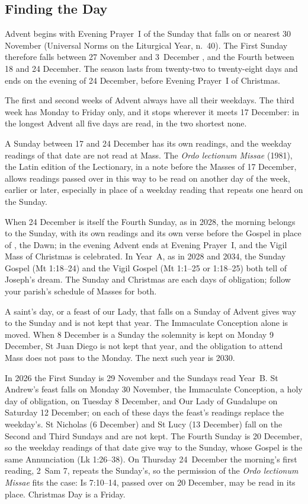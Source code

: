 \subsection{Finding the Day}

Advent begins with Evening Prayer~I of the Sunday that falls on or nearest 30 November (Universal
Norms on the Liturgical Year, n.~40). The First Sunday therefore falls between 27 November and 3~December
, and the Fourth between 18 and 24 December. The season lasts from twenty-two to
twenty-eight days and ends on the evening of 24 December, before Evening Prayer~I of Christmas.

The first and second weeks of Advent always have all their weekdays. The third week has Monday to
Friday only, and it stops wherever it meets 17 December: in the longest Advent all five days are
read, in the two shortest none.

A Sunday between 17 and 24 December has its own readings, and the weekday readings of that date are
not read at Mass. The \textit{Ordo lectionum Missae} (1981), the Latin edition of the Lectionary,
in a note before the Masses of 17 December, allows readings passed over in this way to be read on
another day of the week, earlier or later, especially in place of a weekday reading that repeats
one heard on the Sunday.

When 24 December is itself the Fourth Sunday, as in 2028, the morning belongs to the Sunday, with
its own readings and its own verse before the Gospel in place of , the Dawn; in the
evening Advent ends at Evening Prayer~I, and the Vigil Mass of Christmas is celebrated. In Year~A,
as in 2028 and 2034, the Sunday Gospel (Mt 1:18--24) and the Vigil Gospel (Mt 1:1--25 or 1:18--25)
both tell of Joseph's dream. The Sunday and Christmas are each days of obligation; follow your
parish's schedule of Masses for both.

A saint's day, or a feast of our Lady, that falls on a Sunday of Advent gives way to the Sunday and
is not kept that year. The Immaculate Conception alone is moved. When 8 December is a Sunday the
solemnity is kept on Monday 9 December, St Juan Diego is not kept that year, and the obligation to
attend Mass does not pass to the Monday. The next such year is 2030.

In 2026 the First Sunday is 29 November and the Sundays read Year~B. St Andrew's feast falls on
Monday 30 November, the Immaculate Conception, a holy day of obligation, on Tuesday 8 December, and
Our Lady of Guadalupe on Saturday 12 December; on each of these days the feast's readings replace
the weekday's. St Nicholas (6 December) and St Lucy (13 December) fall on the Second and Third
Sundays and are not kept. The Fourth Sunday is 20 December, so the weekday readings of that date
give way to the Sunday, whose Gospel is the same Annunciation (Lk 1:26--38). On Thursday 24~December
 the morning's first reading, 2~Sam 7, repeats the Sunday's, so the permission of the
\textit{Ordo lectionum Missae} fits the case: Is 7:10--14, passed over on 20 December, may be read
in its place. Christmas Day is a Friday.

